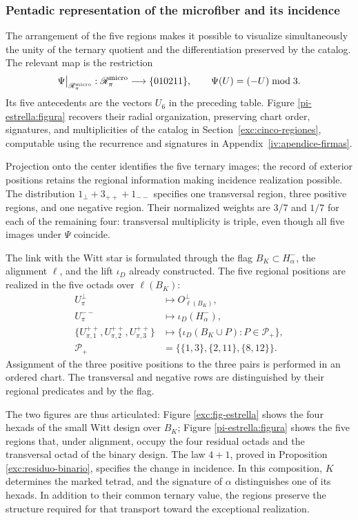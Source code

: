 \subsubsection{Pentadic representation of the microfiber and its incidence}
\label{pi-estrella:desarrollo}

The arrangement of the five regions makes it possible to visualize simultaneously
the unity of the ternary quotient and the differentiation preserved by the
catalog. The relevant map is the restriction
\[
 \Psi\big|_{\mathscr R_\pi^{\rm micro}}:
 \mathscr R_\pi^{\rm micro}\longrightarrow\{010211\},
 \qquad \Psi(U)=(-U)\bmod3.
\]
Its five antecedents are the vectors \(U_6\) in the preceding table.
Figure \ref{pi-estrella:figura} recovers their radial organization,
preserving chart order, signatures, and multiplicities of the
catalog in Section~\ref{exc:cinco-regiones}, computable
using the recurrence and signatures in Appendix~\ref{iv:apendice-firmas}.



Projection onto the center identifies the five ternary images; the
record of exterior positions retains the regional information
making incidence realization possible. The distribution
\(1_\perp+3_{++}+1_{--}\) specifies one transversal region, three
positive regions, and one negative region. Their normalized weights are
\(3/7\) and \(1/7\) for each of the remaining four: transversal
multiplicity is triple, even though all five images under
\(\Psi\) coincide.

The link with the Witt star is formulated through the flag
\(B_K\subset H^-_\alpha\), the alignment \(\ell\), and the
lift \(\iota_D\) already constructed. The five regional positions
are realized in the five octads over \(\ell(B_K)\):
\[
\begin{aligned}
 U_\pi^\perp&\longmapsto O^\perp_{\ell(B_K)},\\
 U_\pi^{--}&\longmapsto\iota_D(H^-_\alpha),\\
 \{U_{\pi,1}^{++},U_{\pi,2}^{++},U_{\pi,3}^{++}\}
 &\longmapsto
 \{\iota_D(B_K\cup P):P\in\mathcal P_+\},\\
 \mathcal P_+&=\bigl\{\{1,3\},\{2,11\},\{8,12\}\bigr\}.
\end{aligned}
\]
Assignment of the three positive positions to the three pairs is
performed in an ordered chart. The transversal and negative rows
are distinguished by their regional predicates and by the flag.

The two figures are thus articulated: Figure
\ref{exc:fig-estrella} shows the four hexads of the small Witt
design over \(B_K\); Figure \ref{pi-estrella:figura} shows
the five regions that, under alignment, occupy the four residual
octads and the transversal octad of the binary design. The law
\(4+1\), proved in Proposition
\ref{exc:residuo-binario}, specifies the change in incidence. In this
composition, \(K\) determines the marked tetrad, and the signature of
\(\alpha\) distinguishes one of its hexads. In addition to their common
ternary value, the regions preserve the structure required for that
transport toward the exceptional realization.

